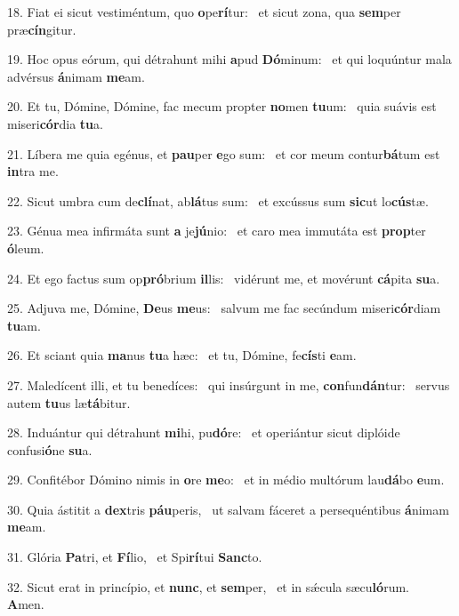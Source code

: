 18. Fiat ei sicut vestiméntum, quo \textbf{o}pe\textbf{rí}tur: \ast\  et sicut zona, qua \textbf{sem}per præ\textbf{cín}gitur.\

19. Hoc opus eórum, qui détrahunt mihi \textbf{a}pud \textbf{Dó}minum: \ast\  et qui loquúntur mala advérsus \textbf{á}nimam \textbf{me}am.\

20. Et tu, Dómine, Dómine, fac mecum propter \textbf{no}men \textbf{tu}um: \ast\  quia suávis est miseri\textbf{cór}dia \textbf{tu}a.\

21. Líbera me quia egénus, et \textbf{pau}per \textbf{e}go sum: \ast\  et cor meum contur\textbf{bá}tum est \textbf{in}tra me.\

22. Sicut umbra cum de\textbf{clí}nat, ab\textbf{lá}tus sum: \ast\  et excússus sum \textbf{sic}ut lo\textbf{cús}tæ.\

23. Génua mea infirmáta sunt \textbf{a} je\textbf{jú}nio: \ast\  et caro mea immutáta est \textbf{prop}ter \textbf{ó}leum.\

24. Et ego factus sum op\textbf{pró}brium \textbf{il}lis: \ast\  vidérunt me, et movérunt \textbf{cá}pita \textbf{su}a.\

25. Adjuva me, Dómine, \textbf{De}us \textbf{me}us: \ast\  salvum me fac secúndum miseri\textbf{cór}diam \textbf{tu}am.\

26. Et sciant quia \textbf{ma}nus \textbf{tu}a hæc: \ast\  et tu, Dómine, fe\textbf{cís}ti \textbf{e}am.\

27. Maledícent illi, et tu benedíces: \dag\  qui insúrgunt in me, \textbf{con}fun\textbf{dán}tur: \ast\  servus autem \textbf{tu}us læ\textbf{tá}bitur.\

28. Induántur qui détrahunt \textbf{mi}hi, pu\textbf{dó}re: \ast\  et operiántur sicut diplóide confusi\textbf{ó}ne \textbf{su}a.\

29. Confitébor Dómino nimis in \textbf{o}re \textbf{me}o: \ast\  et in médio multórum lau\textbf{dá}bo \textbf{e}um.\

30. Quia ástitit a \textbf{dex}tris \textbf{páu}peris, \ast\  ut salvam fáceret a persequéntibus \textbf{á}nimam \textbf{me}am.\

31. Glória \textbf{Pa}tri, et \textbf{Fí}lio, \ast\  et Spi\textbf{rí}tui \textbf{Sanc}to.\

32. Sicut erat in princípio, et \textbf{nunc}, et \textbf{sem}per, \ast\  et in sǽcula sæcu\textbf{ló}rum. \textbf{A}men.\

